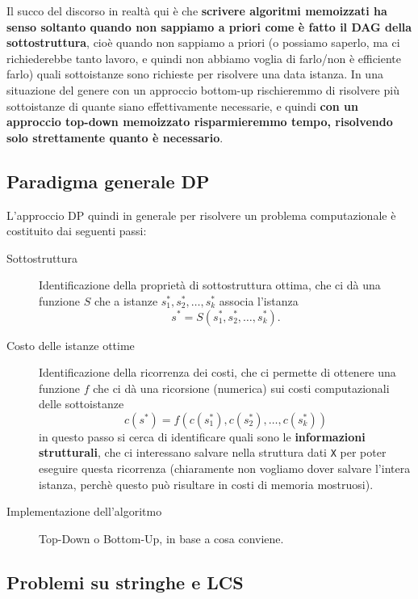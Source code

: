 \documentclass[11pt]{scrartcl}
\begin{document}
	Il succo del discorso in realtà qui è che \textbf{scrivere algoritmi memoizzati ha senso soltanto quando non sappiamo a priori come è fatto il DAG della sottostruttura}, cioè quando non sappiamo a priori (o possiamo saperlo, ma ci richiederebbe tanto lavoro, e quindi non abbiamo voglia di farlo/non è efficiente farlo) quali sottoistanze sono richieste per risolvere una data istanza. In una situazione del genere con un approccio bottom-up rischieremmo di risolvere più sottoistanze di quante siano effettivamente necessarie, e quindi \textbf{con un approccio top-down memoizzato risparmieremmo tempo, risolvendo solo strettamente quanto è necessario}.
	
	\subsection{Paradigma generale DP}
	
	L'approccio DP quindi in generale per risolvere un problema computazionale è costituito dai seguenti passi:
	\begin{description}
		\item[Sottostruttura] Identificazione della proprietà di sottostruttura ottima, che ci dà una funzione $S$ che a istanze $s_1^*,s_2^*,\dots,s_k^*$ associa l'istanza
		$$s^*=S\left(s_1^*,s_2^*,\dots,s_k^*\right).$$
		\item[Costo delle istanze ottime] Identificazione della ricorrenza dei costi, che ci permette di ottenere una funzione $f$ che ci dà una ricorsione (numerica) sui costi computazionali delle sottoistanze
		$$c(s^*)=f(c(s^*_1),c(s^*_2),\dots,c(s^*_k))$$
		in questo passo si cerca di identificare quali sono le \textbf{informazioni strutturali}, che ci interessano salvare nella struttura dati \verb*|X| per poter eseguire questa ricorrenza (chiaramente non vogliamo dover salvare l'intera istanza, perchè questo può risultare in costi di memoria mostruosi).
		\item[Implementazione dell'algoritmo] Top-Down o Bottom-Up, in base a cosa conviene.
	\end{description}
	
	\newpage
	
	\subsection{Problemi su stringhe e LCS}
	
\end{document}
